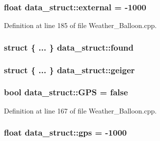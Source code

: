 \subsubsection[{\texorpdfstring{external}{external}}]{\setlength{\rightskip}{0pt plus 5cm}float data\+\_\+struct\+::external = -\/1000}\hypertarget{structdata__struct_a3cf72cbfaf7080218fa994af2867e13c}{}\label{structdata__struct_a3cf72cbfaf7080218fa994af2867e13c}


Definition at line 185 of file Weather\+\_\+\+Balloon.\+cpp.

\subsubsection[{\texorpdfstring{found}{found}}]{\setlength{\rightskip}{0pt plus 5cm}struct \{ ... \}   data\+\_\+struct\+::found}\hypertarget{structdata__struct_a6ca366a5fcb890803160e5ab98344bd1}{}\label{structdata__struct_a6ca366a5fcb890803160e5ab98344bd1}
\subsubsection[{\texorpdfstring{geiger}{geiger}}]{\setlength{\rightskip}{0pt plus 5cm}struct \{ ... \}   data\+\_\+struct\+::geiger}\hypertarget{structdata__struct_a27a2fc394140d1d68724703f6a50a23c}{}\label{structdata__struct_a27a2fc394140d1d68724703f6a50a23c}
\subsubsection[{\texorpdfstring{G\+PS}{GPS}}]{\setlength{\rightskip}{0pt plus 5cm}bool data\+\_\+struct\+::\+G\+PS = false}\hypertarget{structdata__struct_a7c48afe86be1096d0e802ab1c9cd4799}{}\label{structdata__struct_a7c48afe86be1096d0e802ab1c9cd4799}


Definition at line 167 of file Weather\+\_\+\+Balloon.\+cpp.

\subsubsection[{\texorpdfstring{gps}{gps}}]{\setlength{\rightskip}{0pt plus 5cm}float data\+\_\+struct\+::gps = -\/1000}\hypertarget{structdata__struct_a401fd29b3d3b9c55d18a4c32da1c282e}{}\label{structdata__struct_a401fd29b3d3b9c55d18a4c32da1c282e}


